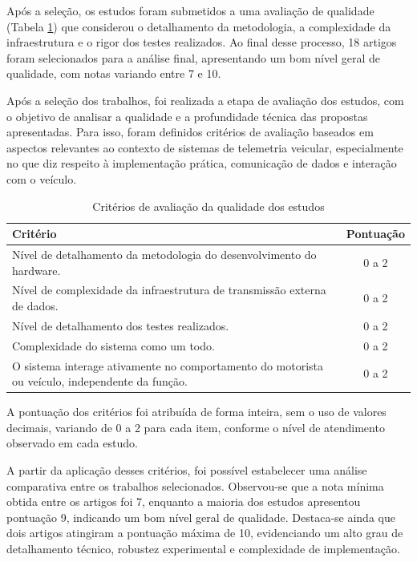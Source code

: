 \documentclass[
	article,			%
	11pt,				%
	oneside,			%
	a4paper,			%
	english,			%
	brazil,				%
	sumario=tradicional
	]{abntex2}
\begin{document}
Após a seleção, os estudos foram submetidos a uma avaliação de qualidade (Tabela \ref{tab:criterios_qualidade}) que considerou o detalhamento da metodologia, a complexidade da infraestrutura e o rigor dos testes realizados. Ao final desse processo, 18 artigos foram selecionados para a análise final, apresentando um bom nível geral de qualidade, com notas variando entre 7 e 10.

Após a seleção dos trabalhos, foi realizada a etapa de avaliação dos estudos, com o objetivo de analisar a qualidade e a profundidade técnica das propostas apresentadas. Para isso, foram definidos critérios de avaliação baseados em aspectos relevantes ao contexto de sistemas de telemetria veicular, especialmente no que diz respeito à implementação prática, comunicação de dados e interação com o veículo.

\begin{table}[H]
   \centering
   \caption{Critérios de avaliação da qualidade dos estudos}
   \label{tab:criterios_qualidade}
   \begin{tabular}{|p{10cm}|c|}
      \hline
      \textbf{Critério}                                                                               & \textbf{Pontuação} \\
      \hline
      Nível de detalhamento da metodologia do desenvolvimento do hardware.                            & 0 a 2              \\
      \hline
      Nível de complexidade da infraestrutura de transmissão externa de dados.                        & 0 a 2              \\
      \hline
      Nível de detalhamento dos testes realizados.                                                    & 0 a 2              \\
      \hline
      Complexidade do sistema como um todo.                                                           & 0 a 2              \\
      \hline
      O sistema interage ativamente no comportamento do motorista ou veículo, independente da função. & 0 a 2              \\
      \hline
   \end{tabular}
\end{table}

A pontuação dos critérios foi atribuída de forma inteira, sem o uso de valores decimais, variando de 0 a 2 para cada item, conforme o nível de atendimento observado em cada estudo.

A partir da aplicação desses critérios, foi possível estabelecer uma análise comparativa entre os trabalhos selecionados. Observou-se que a nota mínima obtida entre os artigos foi 7, enquanto a maioria dos estudos apresentou pontuação 9, indicando um bom nível geral de qualidade. Destaca-se ainda que dois artigos atingiram a pontuação máxima de 10, evidenciando um alto grau de detalhamento técnico, robustez experimental e complexidade de implementação.
\end{document}
